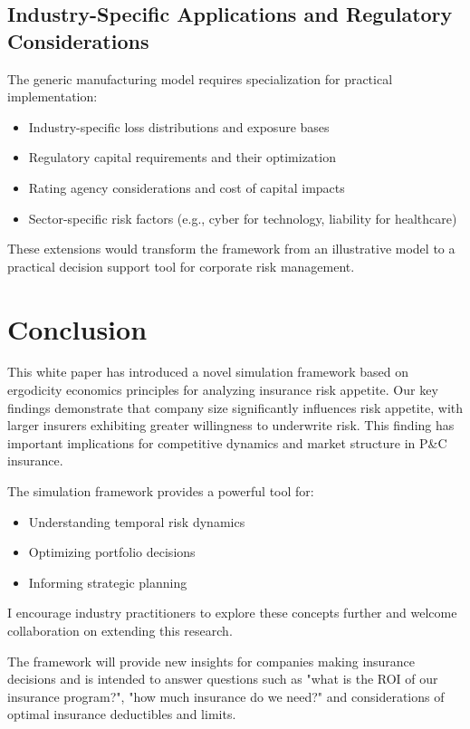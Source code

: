 \documentclass[11pt,letterpaper]{article}
\begin{document}
\subsection{Industry-Specific Applications and Regulatory Considerations}

The generic manufacturing model requires specialization for practical implementation:
\begin{itemize}
    \item Industry-specific loss distributions and exposure bases
    \item Regulatory capital requirements and their optimization
    \item Rating agency considerations and cost of capital impacts
    \item Sector-specific risk factors (e.g., cyber for technology, liability for healthcare)
\end{itemize}

These extensions would transform the framework from an illustrative model to a practical decision support tool for corporate risk management.

\section{Conclusion}

This white paper has introduced a novel simulation framework based on ergodicity economics principles for analyzing insurance risk appetite. Our key findings demonstrate that company size significantly influences risk appetite, with larger insurers exhibiting greater willingness to underwrite risk. This finding has important implications for competitive dynamics and market structure in P\&C insurance.

The simulation framework provides a powerful tool for:
\begin{itemize}
    \item Understanding temporal risk dynamics
    \item Optimizing portfolio decisions
    \item Informing strategic planning
\end{itemize}

I encourage industry practitioners to explore these concepts further and welcome collaboration on extending this research.

The framework will provide new insights for companies making insurance decisions and is intended to answer questions such as "what is the ROI of our insurance program?", "how much insurance do we need?" and considerations of optimal insurance deductibles and limits.
\end{document}
